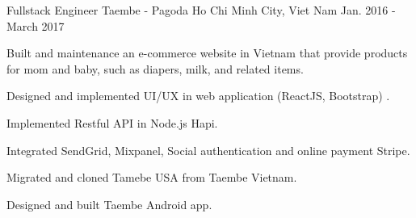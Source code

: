 

\begin{cventries}

  \cventry
    {Fullstack Engineer} %
    {Taembe - Pagoda}
    {Ho Chi Minh City, Viet Nam} %
    {Jan. 2016 - March 2017} %
    {
      \begin{cvitems} %
        \item {Built and maintenance an e-commerce website in Vietnam that provide products for mom and baby, such as diapers, milk, and related items.}
        \item {Designed and implemented UI/UX in web application (ReactJS, Bootstrap) .}
        \item {Implemented Restful API in Node.js Hapi.}
        \item {Integrated SendGrid, Mixpanel, Social authentication and online payment Stripe.}
        \item {Migrated and cloned Tamebe USA from Taembe Vietnam.}
        \item {Designed and built Taembe Android app.}
      \end{cvitems}
    }


\end{cventries}
